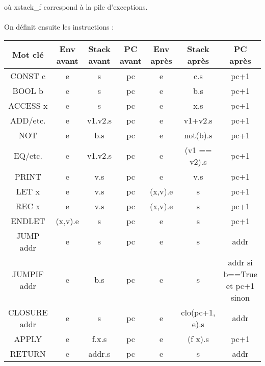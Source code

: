 \documentclass{article}
\newcommand\code[1]{{\fontfamily{lmtt}\selectfont #1}}
\begin{document}
	où \code{xstack\_f} correspond à la pile d'exceptions.
	
	
	\paragraph{} On définit ensuite les instructions :
	
	\vspace{0.5cm}

\begin{footnotesize}
\begin{tabular}{ c | c | c  | c || c | c | c }

Mot clé & Env avant & Stack avant & PC avant & Env après & Stack après & PC après \\
\hline
CONST c & e & s & pc & e & c.s & pc+1 \\

BOOL b & e & s & pc & e & b.s & pc+1 \\

ACCESS x & e & s & pc & e & x.s & pc+1 \\

ADD/etc. & e & v1.v2.s & pc & e & v1+v2.s & pc+1\\

NOT & e & b.s & pc & e & not(b).s & pc+1\\

EQ/etc. & e & v1.v2.s & pc & e & (v1 == v2).s & pc+1\\

PRINT & e & v.s & pc & e & v.s & pc+1 \\

LET x & e & v.s & pc & (x,v).e & s & pc+1\\

REC x & e & v.s & pc & (x,v).e & s & pc+1\\

ENDLET & (x,v).e & s & pc & e & s & pc+1\\

JUMP addr & e & s & pc & e & s & addr\\

JUMPIF addr & e & b.s & pc & e & s & addr si b==True et pc+1 sinon\\

CLOSURE addr & e & s & pc & e & clo(pc+1, e).s & addr\\

APPLY & e & f.x.s & pc & e & (f x).s & pc+1\\

RETURN & e & addr.s & pc & e & s & addr\\


\end{tabular}
\end{footnotesize}
\end{document}
